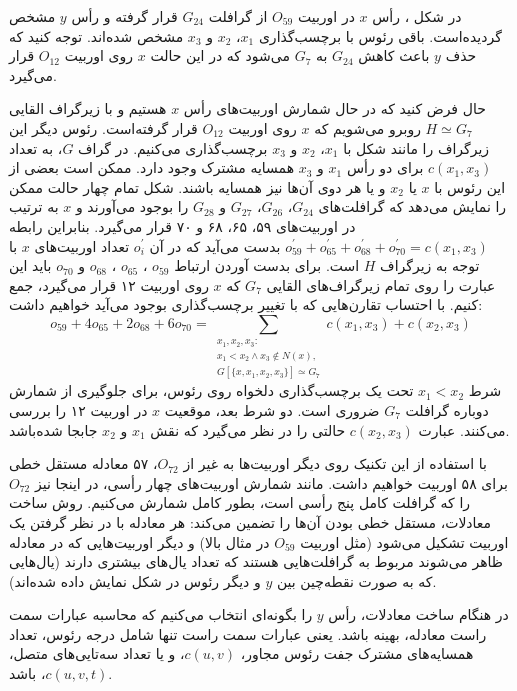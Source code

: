 در شکل ، رأس $x$ در اوربیت $O_{59}$ از گرافلت $G_{24}$ قرار گرفته و رأس $y$ مشخص گردیده‌است. باقی رئوس با برچسب‌گذاری $x_1$، $x_2$ و $x_3$ مشخص شده‌اند. توجه کنید که حذف $y$ باعث کاهش $G_{24}$ به $G_7$ می‌شود که در این حالت $x$ روی اوربیت $O_{12}$ قرار می‌گیرد.

حال فرض کنید که در حال شمارش اوربیت‌های رأس $x$ هستیم و با زیرگراف القایی $H \simeq G_{7}$ روبرو می‌شویم که $x$ روی اوربیت $O_{12}$ قرار گرفته‌است. رئوس دیگر این زیرگراف را مانند شکل با $x_1$، $x_2$ و $x_3$ برچسب‌گذاری می‌کنیم. در گراف $G$، به تعداد $c(x_1,x_3)$ برای دو رأس $x_1$ و $x_3$ همسایه مشترک وجود دارد. ممکن است بعضی از این رئوس با $x$ یا $x_2$ و یا هر دوی آن‌ها نیز همسایه باشند. شکل  تمام چهار حالت ممکن را نمایش می‌دهد که گرافلت‌های $G_{24}$، $G_{26}$، $G_{27}$ و $G_{28}$ را بوجود می‌آورند و $x$ به ترتیب در اوربیت‌های ۵۹، ۶۵، ۶۸ و ۷۰ قرار می‌گیرد. بنابراین رابطه $o^\prime_{59}+ o^\prime_{65}+o^\prime_{68}+o^\prime_{70} = c(x_1,x_3)$ بدست می‌آید که در آن $o^\prime_i$ تعداد اوربیت‌های $x$ با توجه به زیرگراف $H$ است. برای بدست آوردن ارتباط $o_{59}$ ،  $o_{65}$ ،  $o_{68}$ و  $o_{70}$ باید این عبارت را روی تمام زیرگراف‌های القایی $G_7$ که $x$ روی اوربیت ۱۲ قرار می‌گیرد، جمع کنیم. با احتساب تقارن‌هایی که با تغییر برچسب‌گذاری‌ بوجود می‌آید خواهیم داشت:
\begin{equation*}
o_{59}+4o_{65}+2o_{68}+6o_{70} = \sum_{\substack{x_1,x_2,x_3:\\x_1 < x_2\wedge x_3 \notin N(x),\\G[\{x,x_1,x_2,x_3\}]\simeq G_7}}{c(x_1,x_3)+c(x_2,x_3)}
\end{equation*}
شرط $x_1 < x_2$ تحت یک برچسب‌گذاری دلخواه روی رئوس، برای جلوگیری از شمارش دوباره گرافلت $G_7$ ضروری است. دو شرط بعد، موقعیت $x$ در اوربیت ۱۲ را بررسی می‌کنند. عبارت $c(x_2,x_3)$ حالتی را در نظر می‌گیرد که نقش $x_1$ و $x_2$ جابجا شده‌باشد.

با استفاده از این تکنیک روی دیگر اوربیت‌ها به غیر از $O_{72}$،
 ۵۷ معادله مستقل خطی برای ۵۸ اوربیت خواهیم داشت. مانند شمارش اوربیت‌های چهار رأسی، در اینجا نیز $O_{72}$ را که گرافلت کامل پنج رأسی است، بطور کامل شمارش می‌کنیم. روش ساخت معادلات، مستقل خطی بودن آن‌ها را تضمین می‌کند: هر معادله با در نظر گرفتن یک اوربیت تشکیل می‌شود (مثل اوربیت $O_{59}$ در مثال بالا) و دیگر اوربیت‌هایی که در معادله ظاهر می‌شوند مربوط به گرافلت‌هایی هستند که تعداد یال‌های بیشتری دارند (یال‌هایی که به صورت نقطه‌چین بین $y$ و دیگر رئوس در شکل  نمایش داده شده‌اند).
 
در هنگام ساخت معادلات، رأس $y$ را بگونه‌ای انتخاب می‌کنیم که محاسبه عبارات سمت راست معادله، بهینه باشد. یعنی عبارات سمت راست تنها شامل درجه رئوس، تعداد همسایه‌های مشترک جفت رئوس مجاور، $c(u,v)$، و یا تعداد سه‌تایی‌های متصل، $c(u,v,t)$، باشد.


